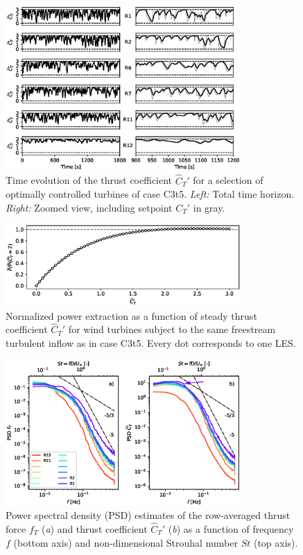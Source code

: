 \documentclass[wes, manuscript]{copernicus}
\newcommand{\cthat}{\widehat{C}_T'}
\begin{document}
\begin{figure}
	\includegraphics[width=0.8\textwidth]{controls.eps}
	\caption{Time evolution of the thrust coefficient $\cthat$ for a selection of optimally controlled turbines  of case C3t5. \emph{Left: } Total time horizon. \emph{Right: } Zoomed view, including setpoint $C_T'$ in gray. \label{fig:controls}}
\end{figure}

\begin{figure}
	\includegraphics[width=0.8\textwidth]{sweep_ct.eps}
	\caption{Normalized power extraction as a function of steady thrust coefficient $\cthat$ for wind turbines subject to the same freestream turbulent inflow as in case C3t5. Every dot corresponds to one LES.\label{fig:ct_sweep}}
\end{figure}

\begin{figure}
	\includegraphics[width=0.8\textwidth]{spectra_thrust_cthat.eps}
	\caption{Power spectral density (PSD) estimates of the row-averaged thrust force $f_T$ (\emph{a}) and thrust coefficient $\cthat$ (\emph{b}) as a function of frequency $f$ (bottom axis) and non-dimensional Strouhal number $St$ (top axis). \label{fig:spectra_thrust_cthat}}
\end{figure}
\end{document}
